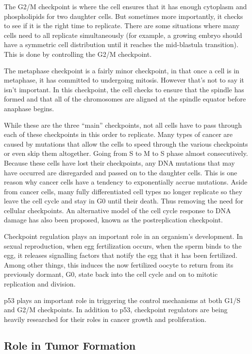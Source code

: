 The G2/M checkpoint is where the cell ensures that it has enough cytoplasm and phospholipids for two daughter cells. But sometimes more importantly, it checks to see if it is the right time to replicate. There are some situations where many cells need to all replicate simultaneously (for example, a growing embryo should have a symmetric cell distribution until it reaches the mid-blastula transition). This is done by controlling the G2/M checkpoint.

The metaphase checkpoint is a fairly minor checkpoint, in that once a cell is in metaphase, it has committed to undergoing mitosis. However that's not to say it isn't important. In this checkpoint, the cell checks to ensure that the spindle has formed and that all of the chromosomes are aligned at the spindle equator before anaphase begins.

While these are the three ``main'' checkpoints, not all cells have to pass through each of these checkpoints in this order to replicate. Many types of cancer are caused by mutations that allow the cells to speed through the various checkpoints or even skip them altogether. Going from S to M to S phase almost consecutively. Because these cells have lost their checkpoints, any DNA mutations that may have occurred are disregarded and passed on to the daughter cells. This is one reason why cancer cells have a tendency to exponentially accrue mutations. Aside from cancer cells, many fully differentiated cell types no longer replicate so they leave the cell cycle and stay in G0 until their death. Thus removing the need for cellular checkpoints. An alternative model of the cell cycle response to DNA damage has also been proposed, known as the postreplication checkpoint.

Checkpoint regulation plays an important role in an organism's development. In sexual reproduction, when egg fertilization occurs, when the sperm binds to the egg, it releases signalling factors that notify the egg that it has been fertilized. Among other things, this induces the now fertilized oocyte to return from its previously dormant, G0, state back into the cell cycle and on to mitotic replication and division.

p53 plays an important role in triggering the control mechanisms at both G1/S and G2/M checkpoints. In addition to p53, checkpoint regulators are being heavily researched for their roles in cancer growth and proliferation.

\hypertarget{role-in-tumor-formation}{%
\subsection{Role in Tumor Formation}\label{role-in-tumor-formation}}

